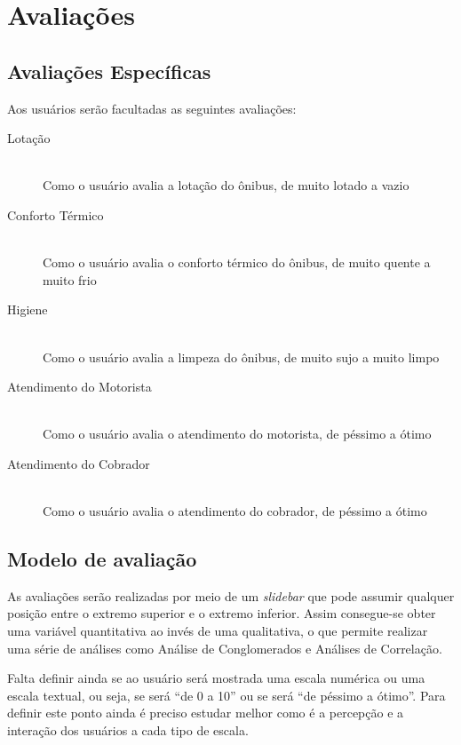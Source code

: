 \section{Avaliações}\label{sec:avalia}
\subsection{Avaliações Específicas}\label{subsec:avaliaspec}
Aos usuários serão facultadas as seguintes avaliações:
\begin{description}
    \item[Lotação] \hfill \\
    Como o usuário avalia a lotação do ônibus, de muito lotado a vazio
    \item[Conforto Térmico] \hfill \\
    Como o usuário avalia o conforto térmico do ônibus, de muito quente a muito frio
    \item[Higiene] \hfill \\
    Como o usuário avalia a limpeza do ônibus, de muito sujo a muito limpo
    \item[Atendimento do Motorista] \hfill \\
    Como o usuário avalia o atendimento do motorista, de péssimo a ótimo
    \item[Atendimento do Cobrador] \hfill \\
    Como o usuário avalia o atendimento do cobrador, de péssimo a ótimo    
\end{description}

\subsection{Modelo de avaliação}\label{subsec:modavalia}
As avaliações serão realizadas por meio de um \textit{slidebar} que pode assumir qualquer posição entre o extremo superior e o extremo inferior. Assim consegue-se obter uma variável quantitativa ao invés de uma qualitativa, o que permite realizar uma série de análises como Análise de Conglomerados e Análises de Correlação.

Falta definir ainda se ao usuário será mostrada uma escala numérica ou uma escala textual, ou seja, se será ``de 0 a 10'' ou se será ``de péssimo a ótimo''. Para definir este ponto ainda é preciso estudar melhor como é a percepção e a interação dos usuários a cada tipo de escala.